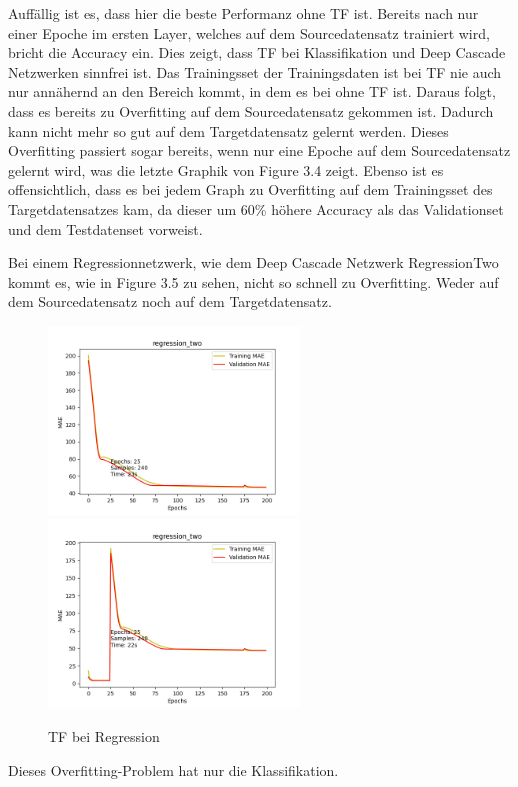 Auffällig ist es, dass hier die beste Performanz ohne TF ist. Bereits nach nur einer Epoche im ersten Layer, welches auf dem Sourcedatensatz 
trainiert wird, bricht die Accuracy ein. Dies zeigt, dass TF bei Klassifikation und Deep Cascade Netzwerken sinnfrei ist. Das 
Trainingsset der Trainingsdaten ist bei TF nie auch nur annähernd an den Bereich kommt, in dem es bei ohne TF ist. Daraus folgt, dass es 
bereits zu Overfitting auf dem Sourcedatensatz gekommen ist. Dadurch kann nicht mehr so gut auf dem Targetdatensatz gelernt werden. Dieses 
Overfitting passiert sogar bereits, wenn nur eine Epoche auf dem Sourcedatensatz gelernt wird, was die letzte Graphik von Figure 3.4 zeigt. 
Ebenso ist es offensichtlich, dass es bei jedem Graph zu Overfitting auf dem Trainingsset des Targetdatensatzes kam, da dieser um 60\% höhere 
Accuracy als das Validationset und dem Testdatenset vorweist. 

Bei einem Regressionnetzwerk, wie dem Deep Cascade Netzwerk RegressionTwo kommt es, wie in Figure 3.5 zu sehen, nicht so schnell zu Overfitting. 
Weder auf dem Sourcedatensatz noch auf dem Targetdatensatz. 

\begin{figure}[htpb]
    \includegraphics[height=5cm]{../../Plots/ba_plots/regr2/woregr2tr.png}
    \includegraphics[height=5cm]{../../Plots/ba_plots/regr2/1TFtr.png}
    \caption{\label{fig:regr2tf} TF bei Regression}
\end{figure}

Dieses Overfitting-Problem hat nur die Klassifikation. %
